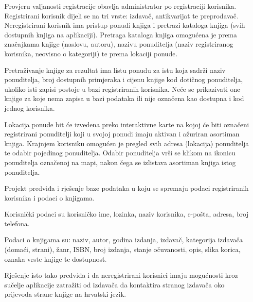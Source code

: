 		Provjeru valjanosti registracije obavlja administrator po registraciji korisnika.
		Registrirani korisnik dijeli se na tri vrste: izdavač, antikvarijat te preprodavač.
		Neregistrirani korisnik ima pristup ponudi knjiga i  pretrazi kataloga knjiga (svih dostupnih knjiga na aplikaciji). Pretraga kataloga knjiga omogućena je prema značajkama knjige (naslovu, autoru), nazivu ponuditelja (naziv registriranog korisnika, neovisno o kategoriji) te prema lokaciji ponude. 
		
		Pretraživanje knjige za rezultat ima listu ponudu za istu koja sadrži naziv ponuditelja, broj dostupnih	primjeraka i cijenu knjige kod dotičnog ponuditelja, ukoliko isti zapisi postoje u bazi registriranih korisnika. Neće se prikazivati one knjige  za koje nema zapisa u bazi podataka  ili nije označena kao dostupna i kod jednog  korisnika.
		
		Lokacija ponude bit će izvedena preko interaktivne karte na kojoj će biti označeni registrirani ponuditelji koji u svojoj ponudi imaju aktivan i ažuriran asortiman knjiga. Krajnjem korisniku omogućen je pregled svih adresa  (lokacija) ponuditelja te odabir pojedinog ponuditelja. Odabir ponuditelja vrši se klikom na ikonicu ponuditelja označenoj na mapi, nakon čega se izlistava asortiman knjiga istog ponuditelja.
		
		Projekt predviđa i rješenje baze podataka u koju se spremaju podaci registriranih korisnika i podaci o knjigama.
		
		Korisnički podaci su korisničko ime, lozinka, naziv korisnika,  e-pošta, adresa, broj telefona.
		
		Podaci o knjigama su: naziv, autor, godina izdanja, izdavač, kategorija izdavača (domaći, strani), žanr, ISBN, broj izdanja, stanje očuvanosti, opis, slika korica, oznaka vrste knjige te dostupnost.
		
		Rješenje isto tako predviđa i da neregistrirani korisnici imaju mogućnosti  kroz sučelje aplikacije zatražiti od izdavača da kontaktira stranog izdavača oko prijevoda strane knjige na hrvatski jezik. 
		